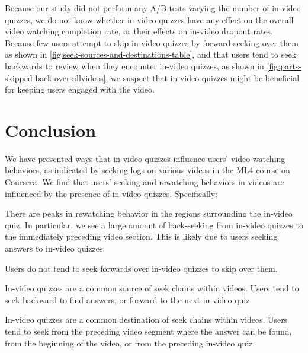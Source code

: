 \documentclass{sigchi}
\begin{document}
Because our study did not perform any A/B tests varying the number of in-video quizzes, we do not know whether in-video quizzes have any effect on the overall video watching completion rate, or their effects on in-video dropout rates. Because few users attempt to skip in-video quizzes by forward-seeking over them as shown in \autoref{fig:seek-sources-and-destinations-table}, and that users tend to seek backwards to review when they encounter in-video quizzes, as shown in \autoref{fig:parts-skipped-back-over-allvideos}, we suspect that in-video quizzes might be beneficial for keeping users engaged with the video. %


\section{Conclusion}

We have presented ways that in-video quizzes influence users' video watching behaviors, as indicated by seeking logs on various videos in the ML4 course on Coursera. We find that users' seeking and rewatching behaviors in videos are influenced by the presence of in-video quizzes. Specifically:

\begin{compactitem}
\item There are peaks in rewatching behavior in the regions surrounding the in-video quiz. In particular, we see a large amount of back-seeking from in-video quizzes to the immediately preceding video section. This is likely due to users seeking answers to in-video quizzes.
\item Users do not tend to seek forwards over in-video quizzes to skip over them.
\item In-video quizzes are a common source of seek chains within videos. Users tend to seek backward to find answers, or forward to the next in-video quiz.
\item In-video quizzes are a common destination of seek chains within videos. Users tend to seek from the preceding video segment where the answer can be found, from the beginning of the video, or from the preceding in-video quiz.
\end{compactitem}




\balance{}

%


\end{document}
